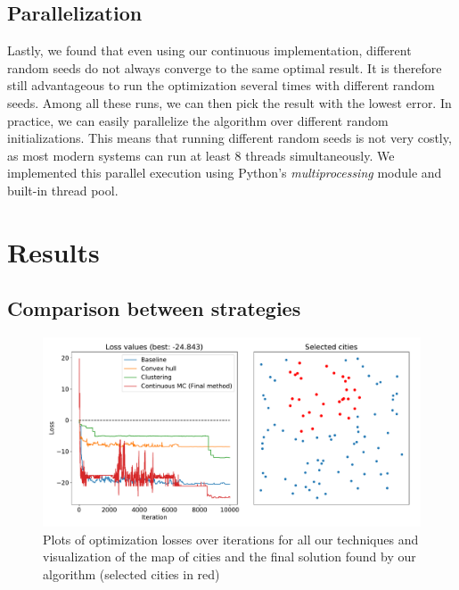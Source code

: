 \documentclass[conference,compsoc]{IEEEtran}
\begin{document}
\subsection{Parallelization}
Lastly, we found that even using our continuous implementation, different random
seeds do not always converge to the same optimal result. It is therefore still
advantageous to run the optimization several times with different random seeds.
Among all these runs, we can then pick the result with the lowest error. In
practice, we can easily parallelize the algorithm over different random
initializations. This means that running different random seeds is not very
costly, as most modern systems can run at least 8 threads simultaneously. We
implemented this parallel execution using Python's \emph{multiprocessing} module
and built-in thread pool.

\section{Results}
\label{sec:results}

\subsection{Comparison between strategies}


\begin{figure}
    \centering
    \includegraphics[width=\columnwidth,height=0.5\columnwidth]{images/selected_cities_plot.pdf}
    \caption{Plots of optimization losses over iterations for all our techniques and visualization of the map of cities and the final solution found by our algorithm (selected cities in red)}
    \label{fig:selection}
\end{figure}
\end{document}
